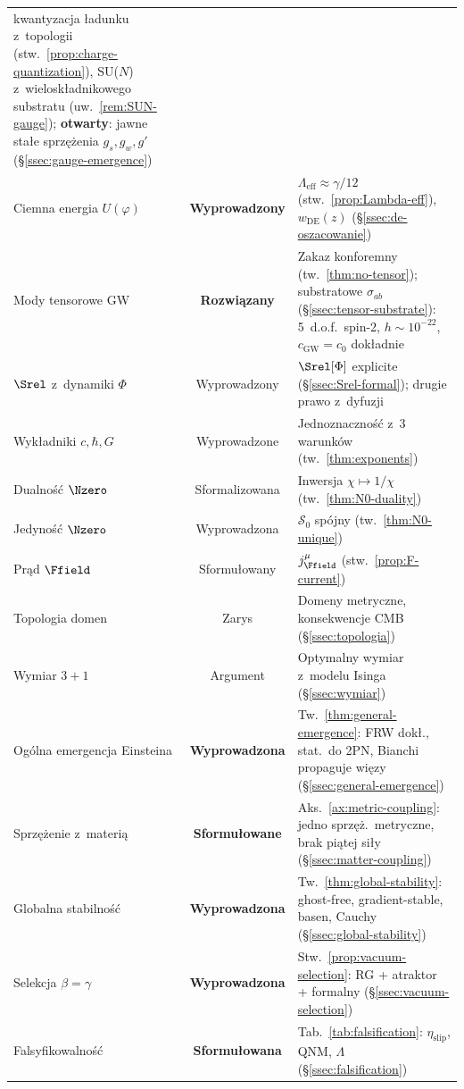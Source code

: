 \begin{center}
\begin{tabular}{@{}>{\raggedright}p{3.5cm}cp{8cm}@{}}
  kwantyzacja \l{}adunku z~topologii (stw.~\ref{prop:charge-quantization}),
  SU($N$) z~wielosk\l{}adnikowego substratu (uw.~\ref{rem:SUN-gauge});
  \textbf{otwarty}: jawne sta\l{}e sprz\k{e}\.zenia $g_s, g_w, g'$
  (\S\ref{ssec:gauge-emergence}) \\
Ciemna energia $U(\varphi)$ & \textbf{Wyprowadzony} &
  $\Lambda_{\mathrm{eff}} \approx \gamma/12$
  (stw.~\ref{prop:Lambda-eff}),
  $w_{\mathrm{DE}}(z)$ (\S\ref{ssec:de-oszacowanie}) \\
Mody tensorowe GW & \textbf{Rozwi\k{a}zany} &
  Zakaz konforemny (tw.~\ref{thm:no-tensor});
  substratowe $\sigma_{ab}$ (\S\ref{ssec:tensor-substrate}):
  5~d.o.f.\ spin-2, $h \sim 10^{-22}$,
  $c_{\mathrm{GW}} = c_0$ dok\l{}adnie \\
$\Srel$ z~dynamiki $\Phi$ & Wyprowadzony &
  $\Srel[\Phi]$ explicite (\S\ref{ssec:Srel-formal});
  drugie prawo z~dyfuzji \\
Wyk\l{}adniki $c,\hbar,G$ & Wyprowadzone &
  Jednoznaczno\'s\'c z~3 warunk\'ow (tw.~\ref{thm:exponents}) \\
Dualno\'s\'c $\Nzero$ & Sformalizowana &
  Inwersja $\chi\mapsto 1/\chi$ (tw.~\ref{thm:N0-duality}) \\
Jedyno\'s\'c $\Nzero$ & Wyprowadzona &
  $\mathcal{S}_0$ sp\'ojny (tw.~\ref{thm:N0-unique}) \\
Pr\k{a}d $\Ffield$ & Sformu\l{}owany &
  $j_\Ffield^\mu$ (stw.~\ref{prop:F-current}) \\
Topologia domen & Zarys &
  Domeny metryczne, konsekwencje CMB
  (\S\ref{ssec:topologia}) \\
Wymiar $3{+}1$ & Argument &
  Optymalny wymiar z~modelu Isinga
  (\S\ref{ssec:wymiar}) \\
Og\'olna emergencja Einsteina & \textbf{Wyprowadzona} &
  Tw.~\ref{thm:general-emergence}: FRW dok\l{}., stat.\ do 2PN,
  Bianchi propaguje wi\k{e}zy (\S\ref{ssec:general-emergence}) \\
Sprz\k{e}\.zenie z~materi\k{a} & \textbf{Sformu\l{}owane} &
  Aks.~\ref{ax:metric-coupling}: jedno sprz\k{e}\.z.\ metryczne,
  brak pi\k{a}tej si\l{}y (\S\ref{ssec:matter-coupling}) \\
Globalna stabilno\'s\'c & \textbf{Wyprowadzona} &
  Tw.~\ref{thm:global-stability}: ghost-free, gradient-stable,
  basen, Cauchy (\S\ref{ssec:global-stability}) \\
Selekcja $\beta=\gamma$ & \textbf{Wyprowadzona} &
  Stw.~\ref{prop:vacuum-selection}: RG + atraktor + formalny
  (\S\ref{ssec:vacuum-selection}) \\
Falsyfikowalno\'s\'c & \textbf{Sformu\l{}owana} &
  Tab.~\ref{tab:falsification}: $\eta_{\mathrm{slip}}$, QNM, $\Lambda$
  (\S\ref{ssec:falsification}) \\
\bottomrule
\end{tabular}
\end{center}

